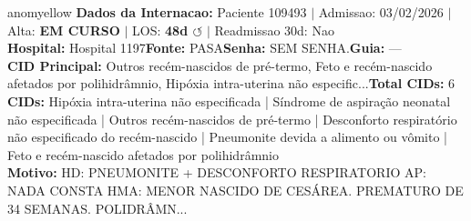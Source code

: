 \documentclass[a4paper,10pt]{article}
\begin{document}
\begin{anomalycard}[Internacao 182309 | PASA | MODERADO (z=2.03)]{anomyellow}
\textbf{Dados da Internacao:} Paciente 109493 $\mid$ Admissao: 03/02/2026 $\mid$ Alta: \textcolor{anomorange}{\textbf{EM CURSO}} $\mid$ LOS: \textbf{48d \textcolor{anomorange}{$\circlearrowleft$}} $\mid$ Readmissao 30d: Nao\\
\textbf{Hospital:} Hospital 1197\quad\textbf{Fonte:} PASA\quad\textbf{Senha:} SEM SENHA.\quad\textbf{Guia:} ---\\
\textbf{CID Principal:} {\small Outros recém-nascidos de pré-termo, Feto e recém-nascido afetados por polihidrâmnio, Hipóxia intra-uterina não especific...}\quad\textbf{Total CIDs:} 6\\

\textbf{CIDs:} {\scriptsize Hipóxia intra-uterina não especificada | Síndrome de aspiração neonatal não especificada | Outros recém-nascidos de pré-termo | Desconforto respiratório não especificado do recém-nascido | Pneumonite devida a alimento ou vômito | Feto e recém-nascido afetados por polihidrâmnio}\\

\textbf{Motivo:} {\scriptsize HD: PNEUMONITE + DESCONFORTO RESPIRATORIO   AP: NADA CONSTA  HMA: MENOR NASCIDO DE CESÁREA. PREMATURO DE 34 SEMANAS. POLIDRÂMN...}\\


\end{anomalycard}
\end{document}
